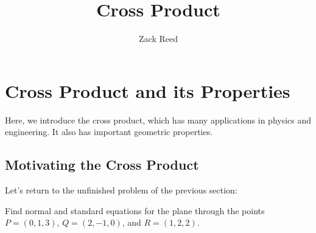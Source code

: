 \documentclass{ximera}
\author{Zack Reed}
\title{Cross Product}
\begin{document}
\begin{abstract}

\end{abstract}
\maketitle

\section*{Cross Product and its Properties}

 Here, we introduce the cross product, which has many applications in physics and engineering.  It also has important geometric properties.
 
\subsection*{Motivating the Cross Product}

Let's return to the unfinished problem of the previous section:

\begin{example}\label{exa:normal-from-three-points}

    Find normal and standard equations for the plane through the points
    $P = (0,1,3)$, $Q=(2,-1,0)$, and $R=(1,2,2)$.
  \end{example}
  
\end{document}
